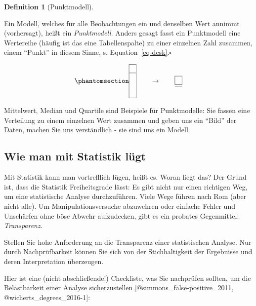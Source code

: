 \documentclass[
  letterpaper,
  DIV=11,
  numbers=noendperiod]{scrartcl}
\theoremstyle{definition}
\theoremstyle{definition}
\theoremstyle{definition}
\newtheorem{definition}{Definition}[section]
\theoremstyle{remark}
\begin{document}
\begin{definition}[Punktmodell]\protect\hypertarget{def-punktmodell}{}\label{def-punktmodell}

Ein Modell, welches für alle Beobachtungen ein und denselben Wert
annimmt (vorhersagt), heißt ein \emph{Punktmodell}. Anders gesagt fasst
ein Punktmodell eine Wertereihe (häufig ist das eine Tabellenspalte) zu
einer einzelnen Zahl zusammen, einem ``Punkt'' in diesem Sinne, s.
Equation~\ref{eq-desk}.\(\square\)

\end{definition}

\begin{equation}\phantomsection\label{eq-desk}{\begin{array}{|c|} \hline \\ \hline \\\\\\ \hline \end{array} \qquad \rightarrow \qquad \begin{array}{|c|} \hline \\ \hline  \hline \end{array}}\end{equation}

Mittelwert, Median und Quartile sind Beispiele für Punktmodelle: Sie
fassen eine Verteilung zu einem einzelnen Wert zusammen und geben uns
ein ``Bild'' der Daten, machen Sie uns verständlich - sie sind uns ein
Modell.

\subsection{Wie man mit Statistik
lügt}\label{wie-man-mit-statistik-luxfcgt}

Mit Statistik kann man vortrefflich lügen, heißt es. Woran liegt das?
Der Grund ist, dass die Statistik Freiheitsgrade lässt: Es gibt nicht
nur einen richtigen Weg, um eine statistische Analyse durchzuführen.
Viele Wege führen nach Rom (aber nicht alle). Um Manipulationsversuche
abzuwehren oder einfache Fehler und Unschärfen ohne böse Abwehr
aufzudecken, gibt es ein probates Gegenmittel: \emph{Transparenz}.

\label{callout-important}
Stellen Sie hohe Anforderung an die Transparenz einer statistischen
Analyse. Nur durch Nachprüfbarkeit können Sie sich von der
Stichhaltigkeit der Ergebnisse und deren Interpretation überzeugen.

Hier ist eine (nicht abschließende!) Checkliste, was Sie nachprüfen
sollten, um die Belastbarkeit einer Analyse sicherzustellen
{[}@simmons\_false-positive\_2011, @wicherts\_degrees\_2016-1{]}:
\end{document}
